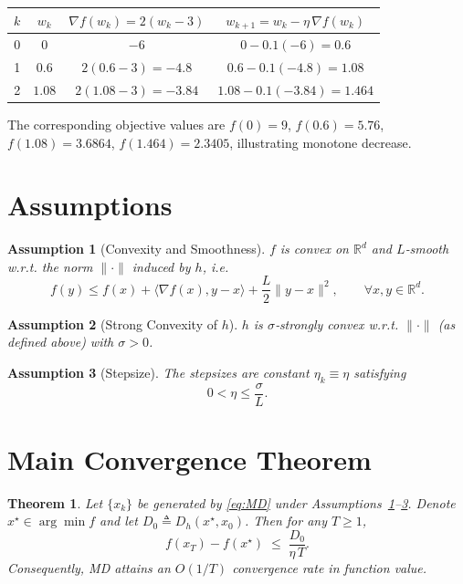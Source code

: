 \documentclass{article}
\newtheorem{theorem}{Theorem}
\newtheorem{assumption}{Assumption}
\newcommand{\inner}[2]{\langle #1,#2\rangle}
\newcommand{\grad}{\nabla}
\newcommand{\Breg}[2]{D_h(#1,#2)}
\newcommand{\R}{\mathbb{R}}
\begin{document}
\begin{center}
\begin{tabular}{c|c|c|c}
$k$ & $w_k$ & $\grad f(w_k)=2(w_k-3)$ & $w_{k+1}=w_k-\eta\,\grad f(w_k)$ \\ \hline
0 & $0$ & $-6$ & $0-0.1(-6)=0.6$ \\
1 & $0.6$ & $2(0.6-3)=-4.8$ & $0.6-0.1(-4.8)=1.08$ \\
2 & $1.08$ & $2(1.08-3)=-3.84$ & $1.08-0.1(-3.84)=1.464$ \\
\end{tabular}
\end{center}
The corresponding objective values are $f(0)=9$, $f(0.6)=5.76$, $f(1.08)=3.6864$, $f(1.464)=2.3405$, illustrating monotone decrease.

\section*{Assumptions}
\begin{assumption}[Convexity and Smoothness]\label{as:convex}
$f$ is convex on $\R^d$ and $L$‑smooth w.r.t. the norm $\|\cdot\|$ induced by $h$, i.e.
\[
f(y)\le f(x)+\inner{\grad f(x)}{y-x}+\frac{L}{2}\|y-x\|^{2},\qquad\forall x,y\in\R^d .
\]
\end{assumption}
\begin{assumption}[Strong Convexity of $h$]\label{as:hstrong}
$h$ is $\sigma$‑strongly convex w.r.t. $\|\cdot\|$ (as defined above) with $\sigma>0$.
\end{assumption}
\begin{assumption}[Stepsize]\label{as:stepsize}
The stepsizes are constant $\eta_k\equiv\eta$ satisfying
\[
0<\eta\le \frac{\sigma}{L}.
\]
\end{assumption}

\section*{Main Convergence Theorem}
\begin{theorem}\label{thm:MD}
Let $\{x_k\}$ be generated by \eqref{eq:MD} under Assumptions~\ref{as:convex}--\ref{as:stepsize}. Denote $x^{\star}\in\arg\min f$ and let $D_{0}\triangleq \Breg{x^{\star}}{x_0}$. Then for any $T\ge1$,
\[
f(x_T)-f(x^{\star})\;\le\;\frac{D_{0}}{\eta\,T}.
\]
Consequently, MD attains an $O(1/T)$ convergence rate in function value.
\end{theorem}
\end{document}
